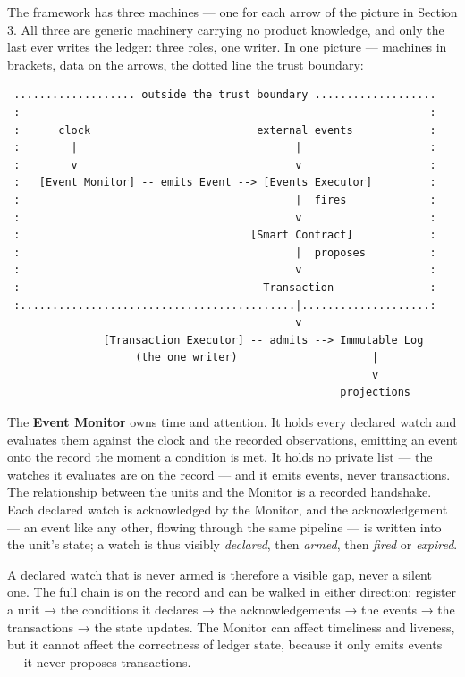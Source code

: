 \documentclass[11pt,a4paper]{article}
\begin{document}
The framework has three machines --- one for each arrow of the picture
in Section 3. All three are generic machinery carrying no product
knowledge, and only the last ever writes the ledger: three roles, one
writer. In one picture --- machines in brackets, data on the arrows, the
dotted line the trust boundary:

\begin{verbatim}
 ................... outside the trust boundary ...................
 :                                                                :
 :      clock                          external events            :
 :        |                                  |                    :
 :        v                                  v                    :
 :   [Event Monitor] -- emits Event --> [Events Executor]         :
 :                                           |  fires             :
 :                                           v                    :
 :                                    [Smart Contract]            :
 :                                           |  proposes          :
 :                                           v                    :
 :                                      Transaction               :
 :...........................................|....................:
                                             v
               [Transaction Executor] -- admits --> Immutable Log
                    (the one writer)                     |
                                                         v
                                                    projections
\end{verbatim}

The \textbf{Event Monitor} owns time and attention. It holds every
declared watch and evaluates them against the clock and the recorded
observations, emitting an event onto the record the moment a condition
is met. It holds no private list --- the watches it evaluates are on the
record --- and it emits events, never transactions. The relationship
between the units and the Monitor is a recorded handshake. Each declared
watch is acknowledged by the Monitor, and the acknowledgement --- an
event like any other, flowing through the same pipeline --- is written
into the unit's state; a watch is thus visibly \emph{declared}, then
\emph{armed}, then \emph{fired} or \emph{expired}.

A declared watch that is never armed is therefore a visible gap, never a
silent one. The full chain is on the record and can be walked in either
direction: register a unit → the conditions it declares → the
acknowledgements → the events → the transactions → the state updates.
The Monitor can affect timeliness and liveness, but it cannot affect the
correctness of ledger state, because it only emits events --- it never
proposes transactions.
\end{document}
